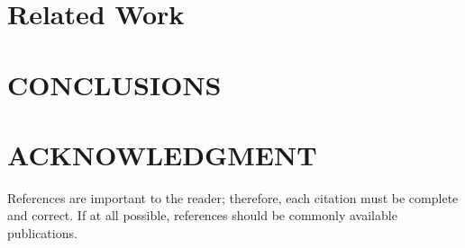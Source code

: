 \documentclass[letterpaper, 10 pt, conference]{ieeeconf}  %
\begin{document}
 
 
 \section {Related Work}
 
 
 
\section{CONCLUSIONS}


\addtolength{\textheight}{-12cm}   %








\section*{ACKNOWLEDGMENT}





References are important to the reader; therefore, each citation must be complete and correct. If at all possible, references should be commonly available publications.
\end{document}
